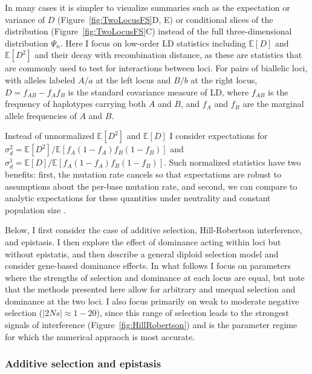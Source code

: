 \documentclass[]{article}
\newcommand{\E}{\mathbb{E}}
\begin{document}
In many cases it is simpler to visualize summaries such as the expectation or
variance of \(D\) (Figure~\ref{fig:TwoLocusFS}D, E) or conditional slices of
the distribution (Figure~\ref{fig:TwoLocusFS}C) instead of the full
three-dimensional distribution \(\Psi_n\). Here I focus on low-order LD
statistics including \(\E[D]\) and \(\E[D^2]\) and their decay with
recombination distance, as these are statistics that are commonly used to test
for interactions between loci. For pairs of biallelic loci, with alleles
labeled \(A/a\) at the left locus and \(B/b\) at the right locus,
\(D=f_{AB}-f_A f_B\) is the standard covariance measure of LD, where \(f_{AB}\)
is the frequency of haplotypes carrying both \(A\) and \(B\), and \(f_A\) and
\(f_B\) are the marginal allele frequencies of \(A\) and \(B\).

Instead of unnormalized \(\E[D^2]\) and \(\E[D]\) I consider expectations for
\(\sigma_d^2 = \E[D^2]/\E[f_A(1-f_A)f_B(1-f_B)]\) and \(\sigma_d^1 =
\E[D]/\E[f_A(1-f_A)f_B(1-f_B)]\).  Such normalized statistics have two
benefits: first, the mutation rate cancels so that expectations are robust to
assumptions about the per-base mutation rate, and second, we can compare to
analytic expectations for these quantities under neutrality and constant
population size \citep{Ohta1971-yd}.

Below, I first consider the case of additive selection, Hill-Robertson
interference, and epistasis. I then explore the effect of dominance acting
within loci but without epistatis, and then describe a general diploid
selection model and consider gene-based dominance effects. In what follows I
focus on parameters where the strengths of selection and dominance at each
locus are equal, but note that the methods presented here allow for arbitrary
and unequal selection and dominance at the two loci. I also focus primarily on
weak to moderate negative selection (\(|2Ns| \approx 1 - 20\)), since this
range of selection leads to the strongest signals of interference
(Figure~\ref{fig:HillRobertson}) and is the parameter regime for which the
numerical appraoch is most accurate.

\subsubsection{Additive selection and epistasis}
\label{sec:additive-selection}
\end{document}

